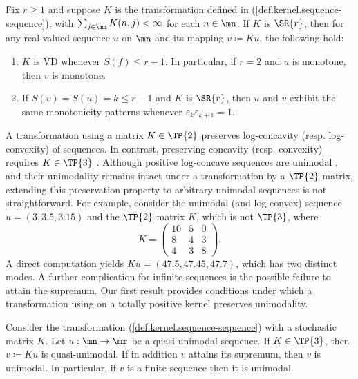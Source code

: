 \documentclass[11pt]{article}
\begin{document}
	\begin{thm}\label{def.vd}
		Fix $r \ge 1$ and suppose  $K$  is the transformation  defined in (\ref{def.kernel.sequence-sequence}), with  $\sum_{j \in \mn} K(n, j) < \infty$ for each $n \in \mn$. If $K$ is $\SR{r}$, then for any  real-valued sequence $u$ on $\mn$ and its mapping 	$v\coloneqq K u$,  the following  hold:
		\begin{enumerate}[label=\rm(\roman*)]
			\item  $K$ is VD whenever $S({f}) \le r-1$.  In particular, if $r=2$ and $u$ is monotone, then $v$ is monotone.
			\item If $S({v})=S({u}) = k \le r-1$ and $K$ is $\SR{r}$, then ${u} $ and ${v}$ exhibit the same monotonicity patterns whenever  $\varepsilon_k\varepsilon_{k+1}=1$.%
		\end{enumerate}
	\end{thm}%
	A transformation using a matrix $K \in \TP{2}$  preserves log-concavity (resp. log-convexity) of sequences. In contrast, preserving concavity (resp. convexity) requires $K \in \TP{3}$  \cite{KarlinProschan}. Although positive log-concave sequences are unimodal  \cite{Stanley}, and their unimodality remains intact under a transformation by a $\TP{2}$ matrix, extending this preservation property to arbitrary unimodal sequences is not straightforward. For example, consider the unimodal (and log-convex) sequence $u=(3, 3.5, 3.15)$ and the  $\TP{2}$ matrix $K$, which is not $\TP{3}$, where
	$$
	K=\left(\begin{array}{ccc}
		10 & 5 & 0\\
		8 & 4 & 3\\
		4 & 3 & 8
	\end{array}\right).
	$$
	A direct computation yields $ Ku = (47.5, 47.45, 47.7)$, which has two distinct modes. A further complication for infinite sequences is the possible failure to attain the supremum.  Our first result provides conditions under which a transformation using on a totally positive kernel preserves unimodality.


\begin{thm}\label{thm.unimodality}
Consider  the transformation  (\ref{def.kernel.sequence-sequence}) with a stochastic matrix  $K$. Let $u : \mn \to \mr$ be a quasi-unimodal sequence. If $K  \in \TP{3}$, then  $v \coloneqq K u$ is quasi-unimodal. If in addition $v$ attains its supremum, then $v$ is unimodal. In particular, if $v$ is a finite sequence then it is unimodal.
\end{thm}
\end{document}
